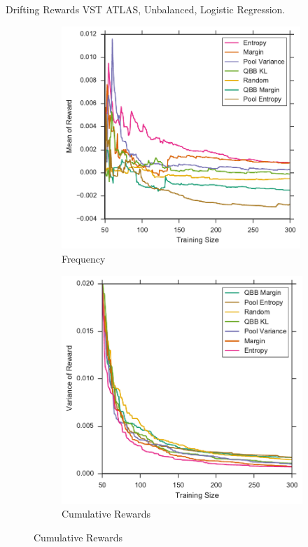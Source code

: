 \documentclass{beamer}
\begin{document}
\begin{frame}{Drifting Rewards}
	VST ATLAS, Unbalanced, Logistic Regression.
	\begin{figure}[tbp]
		\centering
		\begin{subfigure}{.5\textwidth}
			\centering
			\includegraphics[width=0.99\textwidth]{../thesis/figures/5_thompson/vstatlas_ul_avg_rewards}
			\caption{Frequency}
		\end{subfigure}%
		\begin{subfigure}{.5\textwidth}
			\centering
			\includegraphics[width=0.99\linewidth]{../thesis/figures/5_thompson/vstatlas_ul_sigmas}
			\caption{Cumulative Rewards}
		\end{subfigure}
	\end{figure}
\end{frame}
\end{document}
